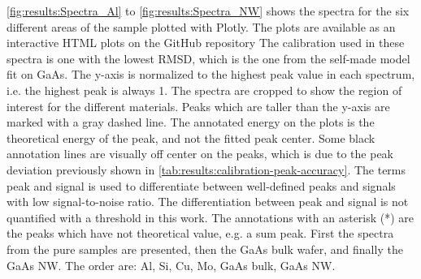 \cref{fig:results:Spectra_Al} to \cref{fig:results:Spectra_NW} shows the spectra for the six different areas of the sample plotted with Plotly.
The plots are available as an interactive HTML plots on the GitHub repository
The calibration used in these spectra is one with the lowest RMSD, which is the one from the self-made model fit on GaAs.
The y-axis is normalized to the highest peak value in each spectrum, i.e. the highest peak is always 1. %
The spectra are cropped to show the region of interest for the different materials.
Peaks which are taller than the y-axis are marked with a gray dashed line.
The annotated energy on the plots is the theoretical energy of the peak, and not the fitted peak center.
Some black annotation lines are visually off center on the peaks, which is due to the peak deviation previously shown in \cref{tab:results:calibration-peak-accuracy}.
The terms peak and signal is used to differentiate between well-defined peaks and signals with low signal-to-noise ratio.
The differentiation between peak and signal is not quantified with a threshold in this work. %
The annotations with an asterisk (*) are the peaks which have not theoretical value, e.g. a sum peak.
First the spectra from the pure samples are presented, then the GaAs bulk wafer, and finally the GaAs NW.
The order are: Al, Si, Cu, Mo, GaAs bulk, GaAs NW.




